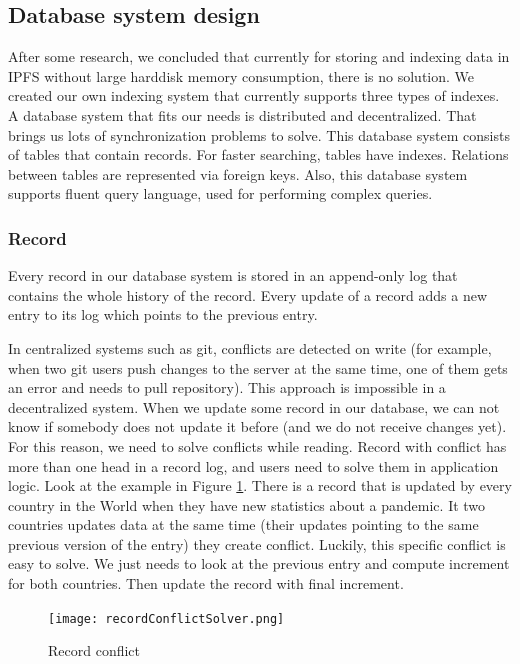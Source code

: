 \subsection{Database system design}
After some research, we concluded that currently for storing and indexing data in IPFS without large harddisk memory consumption, there is no solution. We created our own indexing system that currently supports three types of indexes. A database system that fits our needs is distributed and decentralized. That brings us lots of synchronization problems to solve. This database system consists of tables that contain records. For faster searching, tables have indexes. Relations between tables are represented via foreign keys. Also, this database system supports fluent query language, used for performing complex queries.

\subsubsection{Record} 
Every record in our database system is stored in an append-only log that contains the whole history of the record. Every update of a record adds a new entry to its log which points to the previous entry. 

In centralized systems such as git, conflicts are detected on write (for example, when two git users push changes to the server at the same time, one of them gets an error and needs to pull repository). This approach is impossible in a decentralized system. When we update some record in our database, we can not know if somebody does not update it before (and we do not receive changes yet). For this reason, we need to solve conflicts while reading. Record with conflict has more than one head in a record log, and users need to solve them in application logic. Look at the example in Figure \ref{recordConflict}. There is a record that is updated by every country in the World when they have new statistics about a pandemic. It two countries updates data at the same time (their updates pointing to the same previous version of the entry) they create conflict. Luckily, this specific conflict is easy to solve. We just needs to look at the previous entry and compute increment for both countries. Then update the record with final increment.


\begin{figure}[h]
    \centering
    \texttt{[image: recordConflictSolver.png]}
    \caption{Record conflict}
    \label{recordConflict}
\end{figure}


